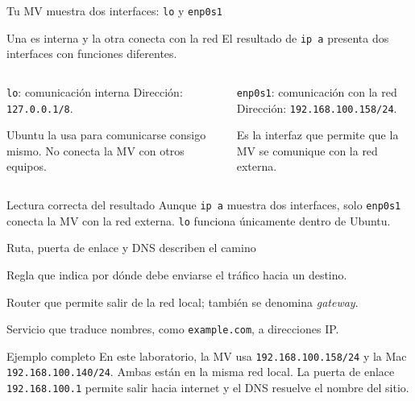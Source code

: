 \documentclass[aspectratio=169,10pt,c]{beamer}
\begin{document}
\begin{frame}{Tu MV muestra dos interfaces: \texttt{lo} y \texttt{enp0s1}}
\begin{block}{Una es interna y la otra conecta con la red}
\small El resultado de \texttt{ip a} presenta dos interfaces con funciones diferentes.
\end{block}
\begin{columns}[T,onlytextwidth]
\begin{exampleblock}{\texttt{lo}: comunicación interna}
\small
Dirección: \texttt{127.0.0.1/8}.\par
Ubuntu la usa para comunicarse consigo mismo. No conecta la MV con otros equipos.
\end{exampleblock}
\begin{exampleblock}{\texttt{enp0s1}: comunicación con la red}
\small
Dirección: \texttt{192.168.100.158/24}.\par
Es la interfaz que permite que la MV se comunique con la red externa.
\end{exampleblock}
\end{columns}
\begin{alertblock}{Lectura correcta del resultado}
\small Aunque \texttt{ip a} muestra dos interfaces, solo \texttt{enp0s1} conecta la MV con la red externa. \texttt{lo} funciona únicamente dentro de Ubuntu.
\end{alertblock}
\end{frame}

\begin{frame}{Ruta, puerta de enlace y DNS describen el camino}
\begin{description}\small
  \item[Ruta] Regla que indica por dónde debe enviarse el tráfico hacia un destino.
  \item[Puerta de enlace] Router que permite salir de la red local; también se denomina \emph{gateway}.
  \item[DNS] Servicio que traduce nombres, como \texttt{example.com}, a direcciones IP.
\end{description}
\begin{exampleblock}{Ejemplo completo}
\small En este laboratorio, la MV usa \texttt{192.168.100.158/24} y la Mac \texttt{192.168.100.140/24}. Ambas están en la misma red local. La puerta de enlace \texttt{192.168.100.1} permite salir hacia internet y el DNS resuelve el nombre del sitio.
\end{exampleblock}
\end{frame}
\end{document}

